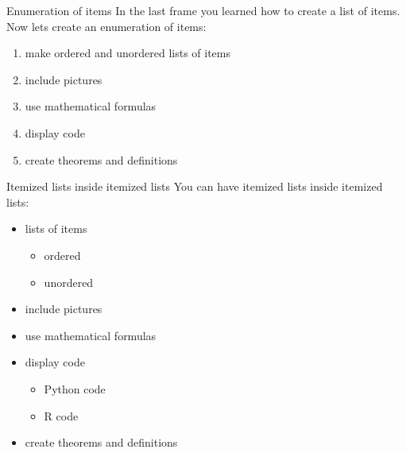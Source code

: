 
\begin{frame}{Enumeration of items}
	In the last frame you learned how to create a list of items. Now lets create an enumeration of items:
	\begin{enumerate}
	\item make ordered and unordered lists of items
	\item include pictures
	\item use mathematical formulas
	\item display code
	\item create theorems and definitions
	\end{enumerate}
\end{frame}


\begin{frame}{Itemized lists inside itemized lists}
	You can have itemized lists inside itemized lists:
	\begin{itemize}
	\item lists of items
		\begin{itemize}
		\item ordered
		\item unordered
		\end{itemize}
	\item include pictures
	\item use mathematical formulas
	\item display code
		\begin{itemize}
		\item Python code
		\item R code
		\end{itemize}
	\item create theorems and definitions
	\end{itemize}
\end{frame}


